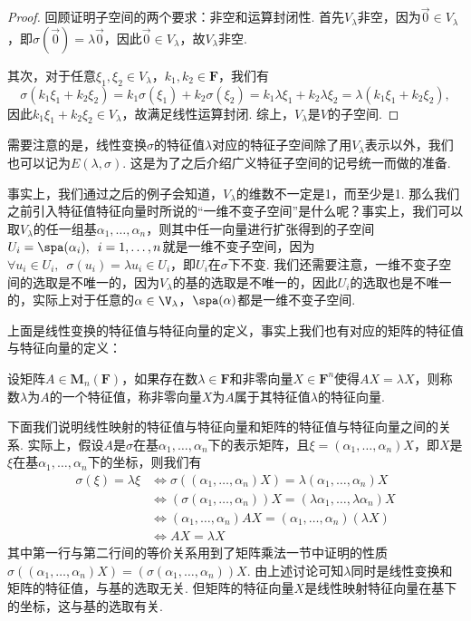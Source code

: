 \begin{proof}
    回顾证明子空间的两个要求：非空和运算封闭性. 首先$V_\lambda$非空，因为$\vec{0}\in V_\lambda$，即$\sigma(\vec{0})=\lambda\vec{0}$，因此$\vec{0}\in V_\lambda$，故$V_\lambda$非空.

    其次，对于任意$\xi_1,\xi_2\in V_\lambda$，$k_1,k_2\in\mathbf{F}$，我们有
    \[\sigma(k_1\xi_1+k_2\xi_2)=k_1\sigma(\xi_1)+k_2\sigma(\xi_2)=k_1\lambda\xi_1+k_2\lambda\xi_2=\lambda(k_1\xi_1+k_2\xi_2),\]
    因此$k_1\xi_1+k_2\xi_2\in V_\lambda$，故满足线性运算封闭. 综上，$V_\lambda$是$V$的子空间.
\end{proof}

需要注意的是，线性变换$\sigma$的特征值$\lambda$对应的特征子空间除了用$V_{\lambda}$表示以外，我们也可以记为$E(\lambda,\sigma)$. 这是为了之后介绍广义特征子空间的记号统一而做的准备.

事实上，我们通过之后的例子会知道，$V_\lambda$的维数不一定是1，而至少是1. 那么我们之前引入特征值特征向量时所说的``一维不变子空间''是什么呢？事实上，我们可以取$V_\lambda$的任一组基$\alpha_1,\ldots,\alpha_n$，则其中任一向量进行扩张得到的子空间$U_i=\spa(\alpha_i),\enspace i=1,\ldots,n$就是一维不变子空间，因为$\forall u_i\in U_i,\enspace \sigma(u_i)=\lambda u_i\in U_i$，即$U_i$在$\sigma$下不变. 我们还需要注意，一维不变子空间的选取是不唯一的，因为$V_\lambda$的基的选取是不唯一的，因此$U_i$的选取也是不唯一的，实际上对于任意的$\alpha\in\V_{\lambda}$，$\spa(\alpha)$都是一维不变子空间.

上面是线性变换的特征值与特征向量的定义，事实上我们也有对应的矩阵的特征值与特征向量的定义：
\begin{definition}
    设矩阵$A\in \mathbf{M}_n(\mathbf{F})$，如果存在数$\lambda\in\mathbf{F}$和非零向量$X\in\mathbf{F}^n$使得$AX=\lambda X$，则称数$\lambda$为$A$的一个特征值，称非零向量$X$为$A$属于其特征值$\lambda$的特征向量.
\end{definition}

下面我们说明线性映射的特征值与特征向量和矩阵的特征值与特征向量之间的关系. 实际上，假设$A$是$\sigma$在基$\alpha_1,\ldots,\alpha_n$下的表示矩阵，且$\xi=(\alpha_1,\ldots,\alpha_n)X$，即$X$是$\xi$在基$\alpha_1,\ldots,\alpha_n$下的坐标，则我们有
\begin{align*}
    \sigma(\xi)=\lambda\xi & \iff \sigma((\alpha_1,\ldots,\alpha_n)X)=\lambda(\alpha_1,\ldots,\alpha_n)X        \\
                           & \iff (\sigma(\alpha_1,\ldots,\alpha_n))X=(\lambda\alpha_1,\ldots,\lambda\alpha_n)X \\
                           & \iff (\alpha_1,\ldots,\alpha_n)AX=(\alpha_1,\ldots,\alpha_n)(\lambda X)            \\
                           & \iff AX=\lambda X
\end{align*}
其中第一行与第二行间的等价关系用到了矩阵乘法一节中证明的性质$\sigma((\alpha_1,\ldots,\alpha_n)X)=(\sigma(\alpha_1,\ldots,\alpha_n))X$. 由上述讨论可知$\lambda$同时是线性变换和矩阵的特征值，与基的选取无关. 但矩阵的特征向量$X$是线性映射特征向量在基下的坐标，这与基的选取有关.

